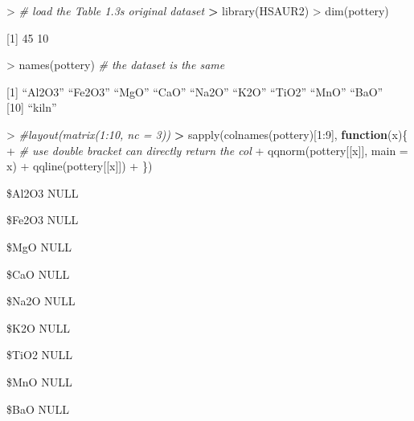 \documentclass[
]{article}
\newenvironment{Shaded}{\begin{snugshade}}{\end{snugshade}}
\newcommand{\AttributeTok}[1]{\textcolor[rgb]{0.77,0.63,0.00}{#1}}
\newcommand{\CommentTok}[1]{\textcolor[rgb]{0.56,0.35,0.01}{\textit{#1}}}
\newcommand{\ControlFlowTok}[1]{\textcolor[rgb]{0.13,0.29,0.53}{\textbf{#1}}}
\newcommand{\DecValTok}[1]{\textcolor[rgb]{0.00,0.00,0.81}{#1}}
\newcommand{\ErrorTok}[1]{\textcolor[rgb]{0.64,0.00,0.00}{\textbf{#1}}}
\newcommand{\FunctionTok}[1]{\textcolor[rgb]{0.00,0.00,0.00}{#1}}
\newcommand{\NormalTok}[1]{#1}
\newcommand{\SpecialCharTok}[1]{\textcolor[rgb]{0.00,0.00,0.00}{#1}}
\begin{document}
\begin{Shaded}
\begin{Highlighting}[]
\SpecialCharTok{\textgreater{}} \CommentTok{\# load the Table 1.3\textquotesingle{}s original dataset }
\ErrorTok{\textgreater{}} \FunctionTok{library}\NormalTok{(HSAUR2)}
\SpecialCharTok{\textgreater{}} \FunctionTok{dim}\NormalTok{(pottery)}
\end{Highlighting}
\end{Shaded}

{[}1{]} 45 10

\begin{Shaded}
\begin{Highlighting}[]
\SpecialCharTok{\textgreater{}} \FunctionTok{names}\NormalTok{(pottery) }\CommentTok{\# the dataset is the same}
\end{Highlighting}
\end{Shaded}

{[}1{]} ``Al2O3'' ``Fe2O3'' ``MgO'' ``CaO'' ``Na2O'' ``K2O'' ``TiO2''
``MnO'' ``BaO''\\
{[}10{]} ``kiln''

\begin{Shaded}
\begin{Highlighting}[]
\SpecialCharTok{\textgreater{}} \CommentTok{\#layout(matrix(1:10, nc = 3))}
\ErrorTok{\textgreater{}} \FunctionTok{sapply}\NormalTok{(}\FunctionTok{colnames}\NormalTok{(pottery)[}\DecValTok{1}\SpecialCharTok{:}\DecValTok{9}\NormalTok{], }\ControlFlowTok{function}\NormalTok{(x)\{}
\SpecialCharTok{+}   \CommentTok{\# use double bracket can directly return the col}
\SpecialCharTok{+}   \FunctionTok{qqnorm}\NormalTok{(pottery[[x]], }\AttributeTok{main =}\NormalTok{ x)}
\SpecialCharTok{+}   \FunctionTok{qqline}\NormalTok{(pottery[[x]])}
\SpecialCharTok{+}\NormalTok{ \})}
\end{Highlighting}
\end{Shaded}

\$Al2O3 NULL

\$Fe2O3 NULL

\$MgO NULL

\$CaO NULL

\$Na2O NULL

\$K2O NULL

\$TiO2 NULL

\$MnO NULL

\$BaO NULL
\end{document}
